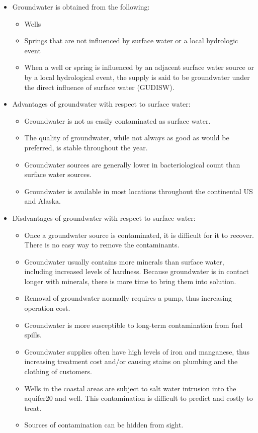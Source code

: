 \begin{itemize}
\item Groundwater is obtained from the following:\\
\begin{itemize}
\item Wells
\item Springs that are not influenced by surface water or a local hydrologic event
\item When a well or spring is influenced by an adjacent surface water source or by a local hydrological event, the supply is said to be groundwater under the direct influence of surface water (GUDISW).
\end{itemize}
\item Advantages of groundwater with respect to surface water:\\
\begin{itemize}
\item Groundwater is not as easily contaminated as surface water.
\item The quality of groundwater, while not always as good as would be preferred, is stable throughout the year.
\item Groundwater sources are generally lower in bacteriological count than surface water sources.
\item Groundwater is available in most locations throughout the continental US and Alaska.
\end{itemize}
\item Disdvantages of groundwater with respect to surface water:\\
\begin{itemize}
\item Once a groundwater source is contaminated, it is difficult for it to recover. There is no easy way to remove the contaminants.
\item Groundwater usually contains more minerals than surface water, including increased levels of hardness. Because groundwater is in contact longer with minerals, there is more time to bring them into solution.
\item Removal of groundwater normally requires a pump, thus increasing operation cost.
\item Groundwater is more susceptible to long-term contamination from fuel spills.
\item Groundwater supplies often have high levels of iron and manganese, thus increasing treatment cost and/or causing stains on plumbing and the clothing of customers.
\item Wells in the coastal areas are subject to salt water intrusion into the aquifer20
and well. This contamination is difficult to predict and costly to treat.
\item Sources of contamination can be hidden from sight.
\end{itemize}
\end{itemize}
